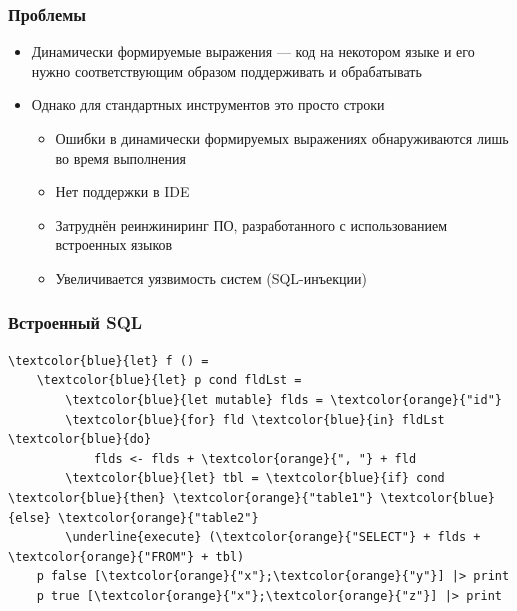 \documentclass{beamer}
\begin{document}

\begin{frame}[fragile]
	\transwipe[direction=90]
	\frametitle{Проблемы}
	\begin{itemize}
	    \item Динамически формируемые выражения --- код на некотором языке и его нужно соответствующим образом поддерживать и обрабатывать
	    \item Однако для стандартных инструментов это просто строки
        \begin{itemize}
    	    \item Ошибки в динамически формируемых выражениях обнаруживаются лишь во время выполнения
	        \item Нет поддержки в IDE
	        \item Затруднён реинжиниринг ПО, разработанного с использованием встроенных языков
	        \item Увеличивается уязвимость систем (SQL-инъекции)
	    \end{itemize}
    \end{itemize}
\end{frame}

\begin{frame}[fragile]
	\transwipe[direction=90]
	\frametitle{Встроенный SQL}
		\begin{Verbatim}[commandchars=\\\{\}]
\textcolor{blue}{let} f () =		
    \textcolor{blue}{let} p cond fldLst =
        \textcolor{blue}{let mutable} flds = \textcolor{orange}{"id"}
        \textcolor{blue}{for} fld \textcolor{blue}{in} fldLst \textcolor{blue}{do}
            flds <- flds + \textcolor{orange}{", "} + fld 
        \textcolor{blue}{let} tbl = \textcolor{blue}{if} cond \textcolor{blue}{then} \textcolor{orange}{"table1"} \textcolor{blue}{else} \textcolor{orange}{"table2"}    
        \underline{execute} (\textcolor{orange}{"SELECT"} + flds + \textcolor{orange}{"FROM"} + tbl)
    p false [\textcolor{orange}{"x"};\textcolor{orange}{"y"}] |> print 
    p true [\textcolor{orange}{"x"};\textcolor{orange}{"z"}] |> print
		\end{Verbatim}
\end{frame}
\end{document}
